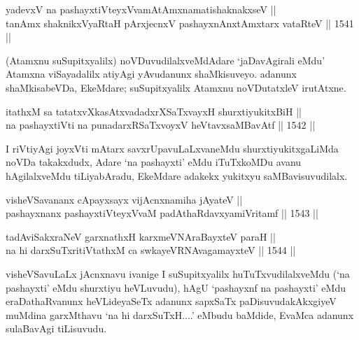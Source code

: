 \begin{shl}
yadevxV na pashayxtiVteyxVvamAtAmxnamatishaknakxseV || \\
tanAmx shaknikxVyaRtaH pArxjecnxV pashayxnAnxtAmx\s tarx vataRteV ||  1541 ||  
\end{shl}

\begin{artha}
(Atamxnu suSupitxyalilx) noVDuvudilalxveMdAdare `jaDavAgirali eMdu' Atamxna viSayadalilx atiyAgi yAvudanunx shaMkisuveyo. adanunx shaMkisabeVDa, EkeMdare; suSupitxyalilx Atamxnu noVDutatxleV irutAtxne.
\end{artha}


\begin{shl}
itathxM sa tatatxvXkasAtxvadadxrXSaTxvayxH shurxtiyukitxBiH || \\
na pashayxtiVti na punadarxRSaTxvoyxV heVtavxsaMBavAtf ||  1542 ||  
\end{shl}

\begin{artha}
I riVtiyAgi joyxVti mAtarx savxrUpavuLaLxvaneMdu shurxtiyukitxgaLiMda noVDa takakxdudx, Adare `na pashayxti' eMdu iTuTxkoMDu avanu hAgilalxveMdu tiLiyabAradu, EkeMdare adakekx yukitxyu saMBavisuvudilalx.
\end{artha}



\begin{shl}
visheVSavananx cApayxsayx vijAcnxnamiha jAyateV || \\
pashayxnanx pashayxtiVteyxVvaM padAthaRdavxyamiVritamf ||  1543 ||  
\end{shl}
				
\begin{shl}
tadAviSakxraNeV garxnathxH karxmeVNA\s \s raBayxteV paraH || \\
na hi darxSuTxritiVtathxM ca swkayeVRNAvagamayxteV ||  1544 ||  
\end{shl}

\begin{artha}
visheVSavuLaLx jAcnxnavu ivanige I suSupitxyalilx huTuTxvudilalxveMdu (`na pashayxti' eMdu shurxtiyu heVLuvudu), hAgU `pashayxnf na pashayxti' eMdu eraDathaRvanunx heVLideyaSeTx adanunx sapxSaTx paDisuvudakAkxgiyeV muMdina garxMthavu `na hi darxSuTxH....' eMbudu baMdide, EvaMca adanunx sulaBavAgi tiLisuvudu.
\end{artha}

